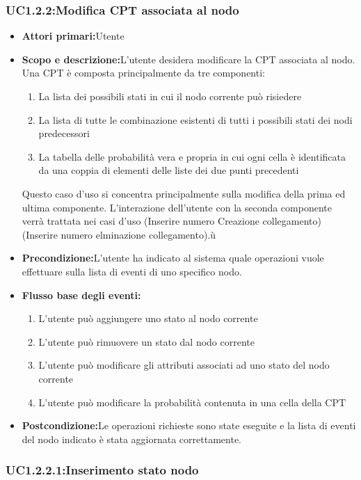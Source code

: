 \subsubsection{UC1.2.2:Modifica CPT associata al nodo}
\begin{itemize}
	\item{\textbf{Attori primari:}Utente}
	\item{\textbf{Scopo e descrizione:}L'utente desidera modificare la CPT associata al nodo. Una CPT è composta principalmente da tre componenti:
	\begin{enumerate}
		\item{La lista dei possibili stati in cui il nodo corrente può risiedere}
		\item{La lista di tutte le combinazione esistenti di tutti i possibili stati dei nodi predecessori}
		\item{La tabella delle probabilità vera e propria in cui ogni cella è identificata da una coppia di elementi delle liste dei due punti precedenti}
	\end{enumerate}
	Questo caso d'uso si concentra principalmente sulla modifica della prima ed ultima componente. L'interazione dell'utente con la seconda componente verrà trattata nei casi d'uso (Inserire numero Creazione collegamento)(Inserire numero elminazione collegamento).ù
}
	\item{\textbf{Precondizione:}L'utente ha indicato al sistema quale operazioni vuole effettuare sulla lista di eventi di uno specifico nodo.}
	\item{\textbf{Flusso base degli eventi:}}
	\begin{enumerate}
		\item{L'utente può aggiungere uno stato al nodo corrente}
		\item{L'utente può rimuovere un stato dal nodo corrente}
		\item{L'utente può modificare gli attributi associati ad uno stato del nodo corrente}
		\item{L'utente può modificare la probabilità contenuta in una cella della CPT}
	\end{enumerate}
	\item{\textbf{Postcondizione:}Le operazioni richieste sono state eseguite e la lista di eventi del nodo indicato è stata aggiornata correttamente.}
\end{itemize}
\subsubsection{UC1.2.2.1:Inserimento stato nodo}
